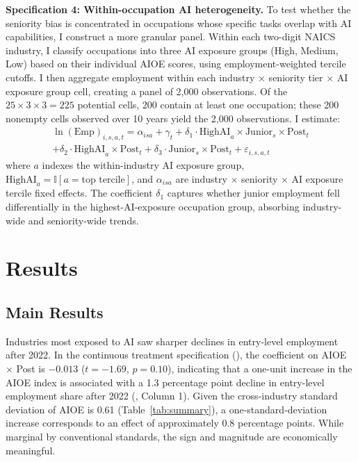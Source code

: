 \documentclass[12pt]{article}
\newcommand{\ind}{\mathbb{I}}
\begin{document}
\textbf{Specification 4: Within-occupation AI heterogeneity.}
\label{sec:hetspec}
To test whether the seniority bias is concentrated in occupations whose specific tasks overlap with AI capabilities, I construct a more granular panel. Within each two-digit NAICS industry, I classify occupations into three AI exposure groups (High, Medium, Low) based on their individual AIOE scores, using employment-weighted tercile cutoffs. I then aggregate employment within each industry $\times$ seniority tier $\times$ AI exposure group cell, creating a panel of 2,000 observations. Of the $25 \times 3 \times 3 = 225$ potential cells, 200 contain at least one occupation; these 200 nonempty cells observed over 10 years yield the 2,000 observations. I estimate:
\begin{multline}
\ln(\text{Emp})_{i,s,a,t} = \alpha_{isa} + \gamma_t + \delta_1 \cdot \text{HighAI}_a \times \text{Junior}_s \times \text{Post}_t \\
+ \delta_2 \cdot \text{HighAI}_a \times \text{Post}_t + \delta_3 \cdot \text{Junior}_s \times \text{Post}_t + \varepsilon_{i,s,a,t}
\label{eq:het}
\end{multline}
where $a$ indexes the within-industry AI exposure group, $\text{HighAI}_a = \ind[a = \text{top tercile}]$, and $\alpha_{isa}$ are industry $\times$ seniority $\times$ AI exposure tercile fixed effects. The coefficient $\delta_1$ captures whether junior employment fell differentially in the highest-AI-exposure occupation group, absorbing industry-wide and seniority-wide trends.


\section{Results}

\subsection{Main Results}

Industries most exposed to AI saw sharper declines in entry-level employment after 2022. In the continuous treatment specification (), the coefficient on AIOE $\times$ Post is $-0.013$ ($t = -1.69$, $p = 0.10$), indicating that a one-unit increase in the AIOE index is associated with a 1.3 percentage point decline in entry-level employment share after 2022 (, Column 1). Given the cross-industry standard deviation of AIOE is 0.61 (Table~\ref{tab:summary}), a one-standard-deviation increase corresponds to an effect of approximately 0.8 percentage points. While marginal by conventional standards, the sign and magnitude are economically meaningful.
\end{document}
